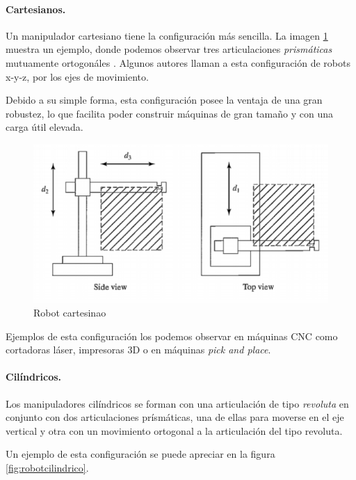 \paragraph{Cartesianos.} Un manipulador cartesiano tiene la configuración más sencilla. La imagen \ref{fig:robotcartesiano} muestra un ejemplo, donde podemos observar tres articulaciones \textit{prismáticas} mutuamente ortogonáles \cite{Craig2013}. Algunos autores llaman a esta configuración de robots x-y-z, por los ejes de movimiento.

Debido a su simple forma, esta configuración posee la ventaja de una gran robustez, lo que facilita poder construir máquinas de gran tamaño y con una carga útil elevada.

\begin{figure}
    \centering
    \includegraphics[scale=0.8]{./img/chapter2/cartesiano.png}
    \caption{Robot cartesinao}
    \label{fig:robotcartesiano}
\end{figure}

Ejemplos de esta configuración los podemos observar en máquinas CNC como cortadoras láser, impresoras 3D o en máquinas \textit{pick and place}. 


\paragraph{Cilíndricos.} Los manipuladores cilíndricos se forman con una articulación de tipo \textit{revoluta} en conjunto con dos articulaciones prísmáticas, una de ellas para moverse en el eje vertical y otra con un movimiento ortogonal a la articulación del tipo revoluta.

Un ejemplo de esta configuración se puede apreciar en la figura \ref{fig:robotcilindrico}.

